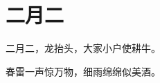\documentclass[12pt,UTF-8,openany]{ctexbook}
\begin{document}
\hanzibox{}\hanzibox{}\hanzibox{}\hanzibox{}\hspace{1em}\hanzibox{}\hanzibox{}\hanzibox{}\hanzibox{}

\hanzibox{}\hanzibox{}\hanzibox{}\hanzibox{}\hspace{1em}\hanzibox{}\hanzibox{}\hanzibox{}\hanzibox{}






\chapter{二月二}

\begin{large}
    
    二月二，龙抬头，大家小户使耕牛。
    
    春雷一声惊万物，细雨绵绵似美酒。
    
\end{large}


\clearpage

\begin{center}
    
    
\end{center}


\hanzibox{}\hanzibox{}\hanzibox{}\hanzibox{}\hspace{1em}\hanzibox{}\hanzibox{}\hanzibox{}\hanzibox{}

\hanzibox{}\hanzibox{}\hanzibox{}\hanzibox{}\hspace{1em}\hanzibox{}\hanzibox{}\hanzibox{}\hanzibox{}

\hanzibox{}\hanzibox{}\hanzibox{}\hanzibox{}\hspace{1em}\hanzibox{}\hanzibox{}\hanzibox{}\hanzibox{}

\hanzibox{}\hanzibox{}\hanzibox{}\hanzibox{}\hspace{1em}\hanzibox{}\hanzibox{}\hanzibox{}\hanzibox{}

\hanzibox{}\hanzibox{}\hanzibox{}\hanzibox{}\hspace{1em}\hanzibox{}\hanzibox{}\hanzibox{}\hanzibox{}
\end{document}
